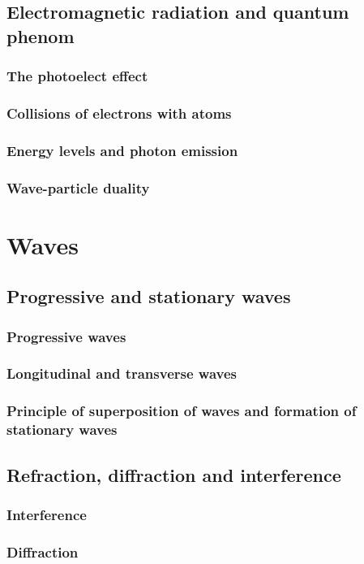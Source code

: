 \chapter{Electromagnetic radiation and quantum phenom}
\section{The photoelect effect}
\section{Collisions of electrons with atoms}
\section{Energy levels and photon emission}
\section{Wave-particle duality}


\part{Waves}
\chapter{Progressive and stationary waves}
\section{Progressive waves}
\section{Longitudinal and transverse waves}
\section{Principle of superposition of waves and formation of stationary waves}

\chapter{Refraction, diffraction and interference}
\section{Interference}
\section{Diffraction}

